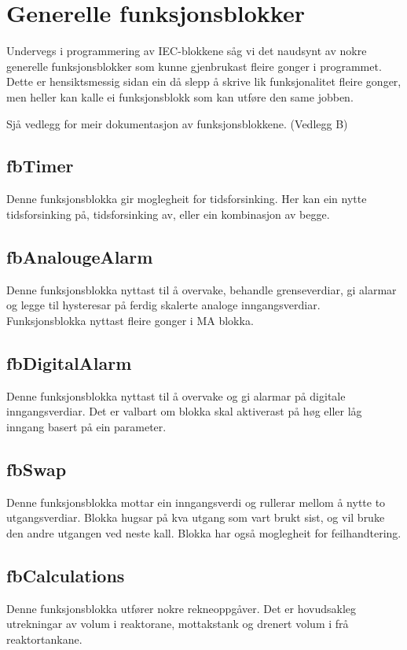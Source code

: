 \section{Generelle funksjonsblokker}
\thispagestyle{fancy}

Undervegs i programmering av \gls{IEC}-blokkene såg vi det naudsynt av nokre generelle funksjonsblokker
som kunne gjenbrukast fleire gonger i programmet. Dette er hensiktsmessig sidan ein då slepp å skrive lik 
funksjonalitet fleire gonger, men heller kan kalle ei funksjonsblokk som kan utføre den same jobben.

Sjå vedlegg for meir dokumentasjon av funksjonsblokkene. (Vedlegg B)

\subsection{fbTimer}
Denne funksjonsblokka gir moglegheit for tidsforsinking.
Her kan ein nytte tidsforsinking på, tidsforsinking av, eller ein kombinasjon av begge.

\subsection{fbAnalougeAlarm}
Denne funksjonsblokka nyttast til å overvake, behandle grenseverdiar, 
gi alarmar og legge til hysteresar på ferdig skalerte analoge inngangsverdiar.
Funksjonsblokka nyttast fleire gonger i MA blokka.

\subsection{fbDigitalAlarm}
Denne funksjonsblokka nyttast til å overvake og gi alarmar på digitale inngangsverdiar. 
Det er valbart om blokka skal aktiverast på høg eller låg inngang basert på ein parameter.

\subsection{fbSwap}\label{sec:1}
Denne funksjonsblokka mottar ein inngangsverdi og rullerar mellom å nytte to utgangsverdiar. Blokka hugsar på kva utgang som vart brukt sist,
og vil bruke den andre utgangen ved neste kall. Blokka har også moglegheit for feilhandtering.

\subsection{fbCalculations}
Denne funksjonsblokka utfører nokre rekneoppgåver. 
Det er hovudsakleg utrekningar av volum i reaktorane, mottakstank og drenert volum i frå reaktortankane.

